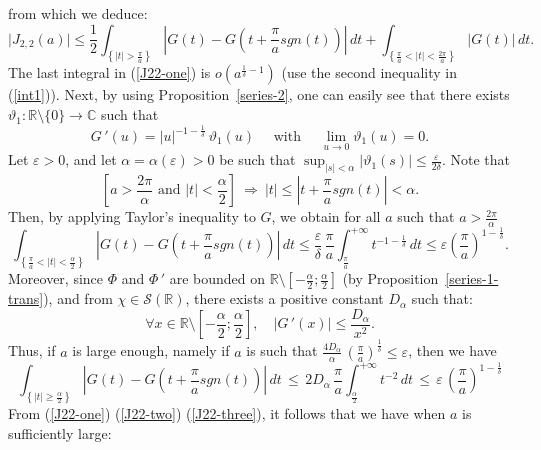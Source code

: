 \documentclass[oneside, a4paper,11pt,reqno]{amsart}
\begin{document}
from which we deduce:   
\begin{equation}
\label{J22-one} 
\big|J_{2,2}(a)\big| 
  \leq \frac 1 2 \int_{\left\{|t| > \frac{\pi}{a}\right\}} 
   \left|G(t) - G\left(t+\frac \pi {a}sgn(t)\right)\right|\, dt + 
   \int_{\left\{\frac{\pi}{a} < |t| < \frac{2\pi}{a}\right\}} |G(t)|  \, dt.  
\end{equation}
The last integral in (\ref{J22-one}) is $o(a^{\frac 1\delta-1})$ (use the second inequality in (\ref{int1})). Next, by using Proposition~\ref{series-2}, one can easily see that there exists $\vartheta_1 : {\mathbb R}\setminus\{0\} \rightarrow {\mathbb C}$ such that 
$$G\, '(u) = |u|^{-1-\frac 1\delta}\, \vartheta_1(u) \quad \text{ with }\quad  \lim_{u\rightarrow 0}\vartheta_1(u)=0.$$
Let $\varepsilon>0$, and let $\alpha=\alpha(\varepsilon)>0$ be such that $\sup_{|s|<\alpha}|\vartheta_1(s)|\le 
\frac{\varepsilon}{2\delta}$.  Note that  
$$\left[a>\frac {2\pi} \alpha \text{ and } |t| < \frac{\alpha}{2}\right]\ 
   \Rightarrow\ |t| \leq \left|t+\frac \pi {a}sgn(t)\right| < \alpha.$$
Then, by applying Taylor's inequality to $G$, we obtain for all $a$ such that $a>\frac {2\pi} \alpha$
\begin{equation}
\label{J22-two}
\int_{\left\{\frac{\pi}{a}<|t| < \frac{\alpha}{2}\right\}} 
   \left| G(t) - G\left(t+\frac \pi {a}sgn(t)\right)\right|\, dt 
  \leq  \frac{\varepsilon}{\delta}\, \frac{\pi}{a} \int_{\frac\pi {a}}^{+\infty}
     t^{-1-\frac 1 \delta}\, dt 
  \leq  \varepsilon\left(\frac\pi {a}\right)^{1-\frac 1\delta}. 
\end{equation}
Moreover, since $\Phi$ and $\Phi\, '$ are bounded on ${\mathbb R}\setminus[-\frac{\alpha}{2};\frac{\alpha}{2}]$ (by   Proposition~\ref{series-1-trans}), and from $\chi\in{\mathcal S}({\mathbb R})$, there exists a positive constant $D_\alpha$ such that: 
$$\forall x\in{\mathbb R}\setminus\left[-\frac{\alpha}{2};\frac{\alpha}{2}\right],\quad 
  \big|G\, '(x)\big|
   \leq \frac{D_\alpha}{x^{2}}.$$
Thus, if $a$ is large enough, namely if $a$ is such that $\frac{4D_\alpha}{\alpha}\, (\frac{\pi}{a})^{\frac 1\delta} \leq \varepsilon$, then we have 
\begin{equation}
\label{J22-three}
\int_{\left\{|t| \geq \frac{\alpha}{2}\right\}} \left| G(t) - G\left(t+\frac \pi {a}sgn(t)\right)\right|\, dt 
  \, \leq\,   2 D_\alpha\, \frac{\pi}{a} \int_{\frac{\alpha}{2}}^{+\infty}
     t^{-2}\, dt  
\, \leq\,  \varepsilon\, \left(\frac\pi {a}\right)^{1-\frac 1\delta}
\end{equation}
From (\ref{J22-one}) (\ref{J22-two}) (\ref{J22-three}), it follows that we have when $a$ is sufficiently large: 
\end{document}
